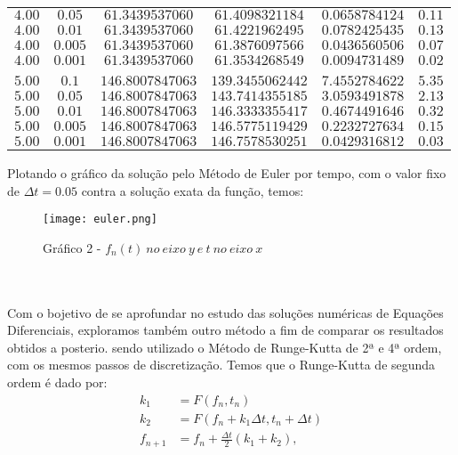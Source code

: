 \documentclass[pdftex,10pt,a4paper]{article}
\begin{document}
\begin{center}
\begin{tabular}{c c c c c c}
$	4.00	$	&	$	0.05	$	&	$	61.3439537060	$	&	$	61.4098321184	$	&	$	0.0658784124	$	&	$	0.11	$	\\
$	4.00	$	&	$	0.01	$	&	$	61.3439537060	$	&	$	61.4221962495	$	&	$	0.0782425435	$	&	$	0.13	$	\\
$	4.00	$	&	$	0.005	$	&	$	61.3439537060	$	&	$	61.3876097566	$	&	$	0.0436560506	$	&	$	0.07	$	\\
$	4.00	$	&	$	0.001	$	&	$	61.3439537060	$	&	$	61.3534268549	$	&	$	0.0094731489	$	&	$	0.02	$	\\
\\																							
$	5.00	$	&	$	0.1	$	&	$	146.8007847063	$	&	$	139.3455062442	$	&	$	7.4552784622	$	&	$	5.35	$	\\
$	5.00	$	&	$	0.05	$	&	$	146.8007847063	$	&	$	143.7414355185	$	&	$	3.0593491878	$	&	$	2.13	$	\\
$	5.00	$	&	$	0.01	$	&	$	146.8007847063	$	&	$	146.3333355417	$	&	$	0.4674491646	$	&	$	0.32	$	\\
$	5.00	$	&	$	0.005	$	&	$	146.8007847063	$	&	$	146.5775119429	$	&	$	0.2232727634	$	&	$	0.15	$	\\
$	5.00	$	&	$	0.001	$	&	$	146.8007847063	$	&	$	146.7578530251	$	&	$	0.0429316812	$	&	$	0.03	$	\\


\hline




\end{tabular}
\end{center}
Plotando o gráfico da solução pelo Método de Euler por tempo, com o valor fixo de $\Delta t = 0.05$ contra a solução exata da função, temos:\\
\begin{figure}[h!]
	\centering
	\texttt{[image: euler.png]}
	\caption*{{\scriptsize Gráfico 2 - $f_{n}(t)\ no\ eixo\ y\ e\ t\ no\ eixo\ x$ }}
\end{figure}\\
\\
\newpage
Com o bojetivo de se aprofundar no estudo das soluções numéricas de Equações Diferenciais, exploramos também outro método a fim de comparar os resultados obtidos a posterio. sendo utilizado o Método de Runge-Kutta de 2ª e 4ª ordem, com os mesmos passos de discretização. Temos que o Runge-Kutta de segunda ordem é dado por:
\begin{equation}
\begin{aligned}
k_1 &= F(f_n,t_n)\\
k_2 &= F(f_n+k_1\Delta t,t_n+\Delta t)\\
f_{n+1} &= f_n + \frac{\Delta t}{2}(k_1+k_2),
\end{aligned}
\end{equation}
\end{document}
